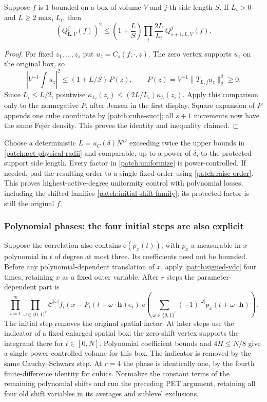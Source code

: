 \documentclass[11pt]{article}
\theoremstyle{definition}
\newcommand{\ee}[1]{\mathrm e\!\left(#1\right)}
\begin{document}
\begin{lemma}\label{patch:uniformize}
Suppose $f$ is $1$-bounded on a box of volume $V$ and $j$-th side length $S$.
If $L_i>0$ and $L\geq2\max_iL_i$, then
\[
 (Q_{\mathbf L,V}^{j}(f))^2
 \leq\left(1+\frac LS\right)\prod_i\frac{2L}{L_i}\ Q_{s+1,L,V}^{j}(f).
\]
\end{lemma}
\begin{proof}
For fixed $z_1,\ldots,z_s$ put $u_z=C_s(f;\cdot,z)$.
The zero vertex supports $u_z$ on the original box, so
\[
 |V^{-1}\!\int u_z|^2\leq(1+L/S)\,P(z),\qquad
 P(z)=V^{-1}\|T_{L,j}u_z\|_2^2\geq0.
\]
Since $L_i\leq L/2$, pointwise
$\kappa_{L_i}(z_i)\leq(2L/L_i)\kappa_L(z_i)$.
Apply this comparison only to the nonnegative $P$, after Jensen in the first display.
Square expansion of $P$ appends one cube coordinate by \eqref{patch:cube-succ}; all $s+1$
increments now have the same Fej\'er density.  This proves the identity and inequality claimed.
\end{proof}
Choose a deterministic $L=u_C(\delta)N^D$ exceeding twice the upper bounds in
\eqref{patch:pet-physical-radii} and comparable, up to a power of $\delta$, to the protected
support side length.  Every factor in \cref{patch:uniformize} is power-controlled.
If needed, pad the resulting order to a single fixed order using \eqref{patch:raise-order}.
This proves highest-active-degree uniformity control with polynomial losses, including the
shifted families \eqref{patch:initial-shift-family}; its protected factor is still the original $f$.

\subsubsection{Polynomial phases: the four initial steps are also explicit}
Suppose the correlation also contains $\ee{p_x(t)}$, with $p_x$ a measurable-in-$x$ polynomial
in $t$ of degree at most three.  Its coefficients need not be bounded.
Before any polynomial-dependent translation of $x$, apply \cref{patch:signed-vdc} four times,
retaining $x$ as a fixed outer variable.  After $r$ steps the parameter-dependent part is
\[
 \prod_{i=1}^{m}\prod_{\omega\in\{0,1\}^r}\mathcal C^{|\omega|}
     f_i(x-P_i(t+\omega\cdot\mathbf h)e_i)\;
 \ee{\sum_{\omega\in\{0,1\}^r}(-1)^{|\omega|}p_x(t+\omega\cdot\mathbf h)}.
\]
The initial step removes the original spatial factor.  At later steps use the indicator of
a fixed enlarged spatial box: the zero-shift vertex supports the integrand there for
$t\in[0,N]$.  Polynomial coefficient bounds and $4H\leq N/8$ give a single power-controlled
volume for this box.  The indicator is removed by the same Cauchy--Schwarz step.
At $r=4$ the phase is identically one, by the fourth finite-difference identity for cubics.
Normalize the constant terms of the remaining polynomial shifts and run the preceding PET
argument, retaining all four old shift variables in its averages and sublevel exclusions.
\end{document}
